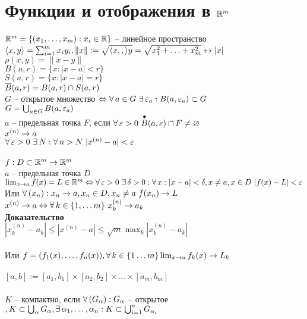 \documentclass[12pt]{article}
\begin{document}
\section{Функции и отображения в $\mathbb{R}^m$}
$\mathbb{R}^m = \{ (x_1, \ldots, x_m): x_i \in \mathbb{R} \}$ -- линейное пространство\\
$\langle x, y \rangle = \sum_{i=1}^m x_iy_i, \|x\|:= \sqrt{\langle x, , \rangle y} = \sqrt{x_1^2 + \ldots + x_m^2} \leftrightarrow |x|$\\
$\rho(x,y) = \|x-y\|$\\
$B(a,r) = \{x: |x-a| < r\}$\\
$S(a,r) = \{x: |x-a| = r\}$\\
$\overline B(a,r) = B(a,r) \cap S(a,r)$\\
$G$ -- открытое множество $\Leftrightarrow \forall\, a \in G\ \exists\, \varepsilon_a: B(a, \varepsilon_a) \subset G$\\
$G = \bigcup_{a \in G} B(a, \varepsilon_a)$\\
$a$ -- предельная точка $F$, если $\forall\, \varepsilon > 0\ \overset{\bullet} B(a,\varepsilon) \cap F \neq \varnothing$\\
$x^{(n)} \rightarrow a$\\
$\fall \eps > 0\ \ex N: \fall n > N\ |x^{(n)}-a|<\eps$\\\\
$f: D\subset \mathbb{R}^m \rightarrow \mathbb{R}^m$\\
$a$ -- предельная точка $D$\\
$\lim_{x\rightarrow a} f(x) = L \in \mathbb{R}^m \Leftrightarrow \forall\, \varepsilon > 0\ \exists\, \delta > 0: \forall\, x: |x-a| < \delta, x \neq a,x \in D\ |f(x) - L| < \varepsilon$\\
Или $\forall\, (x_n): x_n \rightarrow a, x_n \in D, x_n \neq a\ f(x_n) \rightarrow L$\\
$x^{(n)} \rightarrow a \Leftrightarrow \forall\, k \in \{1, \ldots m \}\ x_k^{(n)} \rightarrow a_k$\\
\textbf{Доказательство}\\
$|x_k^{(n)}-a_k| \leq |x^{(n)}-a| \leq \sqrt{m}\max_k |x_k^{(n)}-a_k|$\\\\
Или $f = (f_1(x), \ldots, f_n(x)), \forall\, k \in \{1\ldots m\} \lim_{x\rightarrow a} f_k(x) \rightarrow L_k$\\\\
$[a, b] := [a_1, b_1] \times [a_2, b_2] \times \ldots \times [a_m, b_m]$\\\\
$K$ -- компактно, если $\forall\, (G_\alpha): G_\alpha$ -- открытое$, K \subset \bigcup_\alpha G_\alpha, \exists\, \alpha_1, \ldots, \alpha_n: K \subset \bigcup_{i=1}^n G_{\alpha_i}$\\
\end{document}
